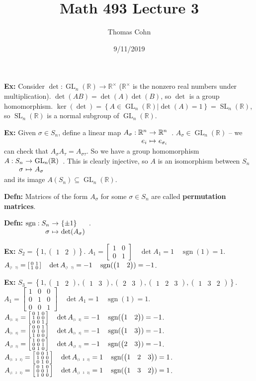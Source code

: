 \documentclass[10pt,letterpaper]{article}
\author{Thomas Cohn}
\title{Math 493 Lecture 3}
\date{9/11/2019} %
\newcommand{\n}{\hfill\break}
\newcommand{\hangblock}[2]{\par\noindent\settowidth{\hangindent}{\textbf{#1: }}\textbf{#1: }\!\!\!#2}
\newcommand{\defn}[1]{\hangblock{Defn}{#1}}
\newcommand{\ex}[1]{\hangblock{Ex}{#1}}
\newcommand{\set}[1]{\left\{#1\right\}}
\newcommand{\reals}{\mathbb{R}}
\newcommand{\R}{\reals}
\DeclareMathOperator{\sgn}{sgn}
\newcommand{\map}[4]{\!\!\!\begin{array}[t]{rcl}#1 & \!\!\!\!\to & \!\!\!\!#2\\ #3 & \!\!\!\!\mapsto & \!\!\!\!#4\end{array}}
\DeclareMathOperator{\GL}{GL}
\newcommand{\smallBMatrix}[1]{\brack{\begin{smallmatrix}#1\end{smallmatrix}}}
\newcommand{\cycle}[1]{\begin{pmatrix}#1\end{pmatrix}}
\newcommand{\subscriptcycle}[1]{\scaleto{\cycle{#1}}{5pt}}
\DeclareMathOperator{\SL}{SL}
\renewcommand{\brack}[1]{\left[#1\right]}
\begin{document}
\maketitle
\setlength\RaggedRightParindent{\parindent}
\RaggedRight

\ex{
	Consider $\det:\GL_{n}(\R)\to\R^{\times}$ ($\R^{\times}$ is the nonzero real numbers under multiplication).\n
	$\det(AB)=\det(A)\det(B)$, so $\det$ is a group homomorphism.\n
	$\ker(\det)=\set{A\in\GL_{n}(\R)|\det(A)=1}=\SL_{n}(\R)$, so $\SL_{n}(\R)$ is a normal subgroup of $\GL_{n}(\R)$.\n
}

\ex{
	Given $\sigma\in{}S_{n}$, define a linear map $\map{A_{\sigma}:\R^{n}}{\R^{n}}{e_{i}}{e_{\sigma_{i}}}$.\n
	$A_{\sigma}\in\GL_{n}(\R)$ -- we can check that $A_{\sigma}A_{\tau}=A_{\sigma\tau}$.\n
	So we have a group homomorphism $\map{A:S_{n}}{\GL_{n}(\R)}{\sigma}{A_{\sigma}}$.\n
	This is clearly injective, so $A$ is an isomorphism between $S_{n}$ and its image $A(S_{n})\subseteq\GL_{n}(\R)$.
}

\defn{
	Matrices of the form $A_{\sigma}$ for some $\sigma\in{}S_{n}$ are called \textbf{permutation matrices}.
}

\defn{
	$\map{\sgn:S_{n}}{\set{\pm{}1}}{\sigma}{\det(A_{\sigma})}$.
}

\ex{
	$S_{2}=\set{1,\cycle{1 & 2}}$.\n
	$A_{1}=\smallBMatrix{1 & 0\\ 0 & 1}\quad\det{}A_{1}=1\quad\sgn(1)=1$.\n
	$A_{\scaleto{\cycle{1 & 2}}{5pt}}=\smallBMatrix{0 & 1\\ 1 & 0}\quad\det{}A_{\scaleto{\cycle{1 & 2}}{5pt}}=-1\quad\sgn(\cycle{1 & 2})=-1$.\n
}

\ex{
	$S_{3}=\set{1, \cycle{1 & 2}, \cycle{1 & 3}, \cycle{2 & 3}, \cycle{1 & 2 & 3}, \cycle{1 & 3 & 2}}$.\n
	$A_{1}=\smallBMatrix{1 & 0 & 0\\ 0 & 1 & 0\\ 0 & 0 & 1}\quad\det{}A_{1}=1\quad\sgn(1)=1$.\n
	$A_{\subscriptcycle{1 & 2}}=\smallBMatrix{0 & 1 & 0\\ 1 & 0 & 0\\ 0 & 0 & 1}\quad\det{}A_{\subscriptcycle{1 & 2}}=-1\quad\sgn(\cycle{1 & 2})=-1$.\n
	$A_{\subscriptcycle{1 & 3}}=\smallBMatrix{0 & 0 & 1\\ 0 & 1 & 0\\ 1 & 0 & 0}\quad\det{}A_{\subscriptcycle{1 & 3}}=-1\quad\sgn(\cycle{1 & 3})=-1$.\n
	$A_{\subscriptcycle{2 & 3}}=\smallBMatrix{1 & 0 & 0\\ 0 & 0 & 1\\ 0 & 1 & 0}\quad\det{}A_{\subscriptcycle{2 & 3}}=-1\quad\sgn(\cycle{2 & 3})=-1$.\n
	$A_{\subscriptcycle{1 & 2 & 3}}=\smallBMatrix{0 & 0 & 1\\ 1 & 0 & 0\\ 0 & 1 & 0}\quad\det{}A_{\subscriptcycle{1 & 2 & 3}}=1\quad\sgn(\cycle{1 & 2 & 3})=1$.\n
	$A_{\subscriptcycle{1 & 3 & 2}}=\smallBMatrix{0 & 1 & 0\\ 0 & 0 & 1\\ 1 & 0 & 0}\quad\det{}A_{\subscriptcycle{1 & 3 & 2}}=1\quad\sgn(\cycle{1 & 3 & 2})=1$.\n
}
\end{document}

